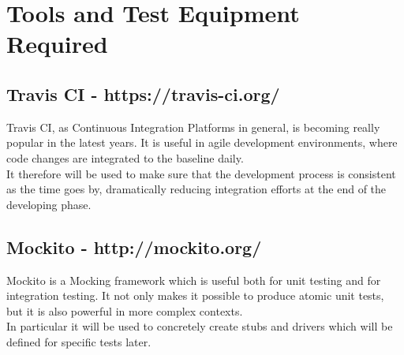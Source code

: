 \section{Tools and Test Equipment Required}

\subsection {Travis CI - https://travis-ci.org/}
Travis CI, as Continuous Integration Platforms in general, is becoming really popular in the latest years. It is useful in agile development environments, where code changes are integrated to the baseline daily. \\
It therefore will be used to make sure that the development process is consistent as the time goes by, dramatically reducing integration efforts at the end of the developing phase.
    
\subsection {Mockito - http://mockito.org/}
Mockito is a Mocking framework which is useful both for unit testing and for integration testing. It not only makes it possible to produce atomic unit tests, but it is also powerful in more complex contexts.\\
In particular it will be used to concretely create stubs and drivers which will be defined for specific tests later. 